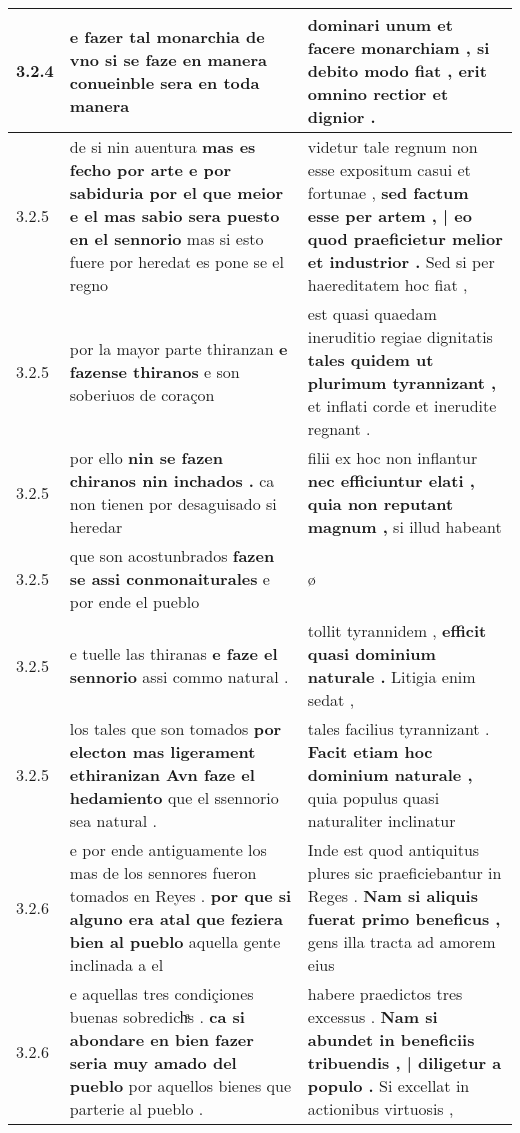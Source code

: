 \begin{tabular}{|p{1cm}|p{6.5cm}|p{6.5cm}|}
3.2.4 & e fazer tal monarchia de vno \textbf{ si se faze en manera } conueinble sera en toda manera & dominari unum et facere monarchiam , \textbf{ si debito modo fiat , } erit omnino rectior et dignior . \\\hline
3.2.5 & de si nin auentura \textbf{ mas es fecho por arte e por sabiduria por el que meior e el mas sabio sera puesto en el sennorio } mas si esto fuere por heredat es pone se el regno & videtur tale regnum non esse expositum casui et fortunae , \textbf{ sed factum esse per artem , | eo quod praeficietur melior et industrior . } Sed si per haereditatem hoc fiat , \\\hline
3.2.5 & por la mayor parte thiranzan \textbf{ e fazense thiranos } e son soberiuos de coraçon & est quasi quaedam ineruditio regiae dignitatis \textbf{ tales quidem ut plurimum tyrannizant , } et inflati corde et inerudite regnant . \\\hline
3.2.5 & por ello \textbf{ nin se fazen chiranos nin inchados . } ca non tienen por desaguisado si heredar & filii ex hoc non inflantur \textbf{ nec efficiuntur elati , quia non reputant magnum , } si illud habeant \\\hline
3.2.5 & que son acostunbrados \textbf{ fazen se assi conmonaiturales } e por ende el pueblo & ø \\\hline
3.2.5 & e tuelle las thiranas \textbf{ e faze el sennorio } assi commo natural . & tollit tyrannidem , \textbf{ efficit quasi dominium naturale . } Litigia enim sedat , \\\hline
3.2.5 & los tales que son tomados \textbf{ por electon mas ligerament ethiranizan Avn faze el hedamiento } que el ssennorio sea natural . & tales facilius tyrannizant . \textbf{ Facit etiam hoc dominium naturale , } quia populus quasi naturaliter inclinatur \\\hline
3.2.6 & e por ende antiguamente los mas de los sennores fueron tomados en Reyes . \textbf{ por que si alguno era atal que feziera bien al pueblo } aquella gente inclinada a el & Inde est quod antiquitus plures sic praeficiebantur in Reges . \textbf{ Nam si aliquis fuerat primo beneficus , } gens illa tracta ad amorem eius \\\hline
3.2.6 & e aquellas tres condiçiones buenas sobredichͣs . \textbf{ ca si abondare en bien fazer seria muy amado del pueblo } por aquellos bienes que parterie al pueblo . & habere praedictos tres excessus . \textbf{ Nam si abundet in beneficiis tribuendis , | diligetur a populo . } Si excellat in actionibus virtuosis , \\\hline

\end{tabular}
